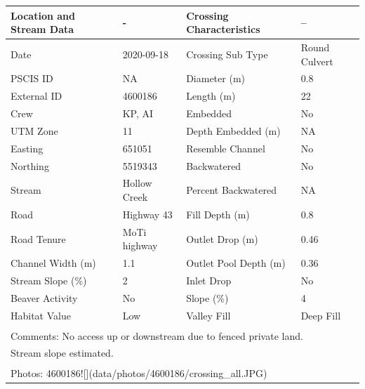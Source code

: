 \documentclass[
]{book}
\begin{document}
\begin{tabular}{llll}
\toprule
Location and Stream Data & - & Crossing Characteristics & --\\
\midrule
Date & 2020-09-18 & Crossing Sub Type & Round Culvert\\
PSCIS ID & NA & Diameter (m) & 0.8\\
External ID & 4600186 & Length (m) & 22\\
Crew & KP, AI & Embedded & No\\
UTM Zone & 11 & Depth Embedded (m) & NA\\
\addlinespace
Easting & 651051 & Resemble Channel & No\\
Northing & 5519343 & Backwatered & No\\
Stream & Hollow Creek & Percent Backwatered & NA\\
Road & Highway 43 & Fill Depth (m) & 0.8\\
Road Tenure & MoTi highway & Outlet Drop (m) & 0.46\\
\addlinespace
Channel Width (m) & 1.1 & Outlet Pool Depth (m) & 0.36\\
Stream Slope (\%) & 2 & Inlet Drop & No\\
Beaver Activity & No & Slope (\%) & 4\\
Habitat Value & Low & Valley Fill & Deep Fill\\
\bottomrule
\multicolumn{4}{l}{\textsuperscript{} Comments: No access up or downstream due to fenced private land.}\\
\multicolumn{4}{l}{Stream slope estimated.}\\
\multicolumn{4}{l}{\textsuperscript{} Photos: 4600186![](data/photos/4600186/crossing\_all.JPG)}\\
\end{tabular}
\end{document}
